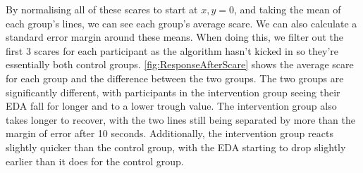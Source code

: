 \documentclass[12pt,a4paper]{article}\usepackage[]{graphicx}\usepackage[]{color}
\begin{document}
By normalising all of these scares to start at $x,y = 0$, and taking the mean of each group's lines, we can see each group's average scare.
We can also calculate a standard error margin around these means.
When doing this, we filter out the first 3 scares for each participant as the algorithm hasn't kicked in so they're essentially both control groups.
\vref{fig:ResponseAfterScare} shows the average scare for each group and the difference between the two groups.
The two groups are significantly different, with participants in the intervention group seeing their EDA fall for longer and to a lower trough value.
The intervention group also takes longer to recover, with the two lines still being separated by more than the margin of error after 10 seconds.
Additionally, the intervention group reacts slightly quicker than the control group, with the EDA starting to drop slightly earlier than it does for the control group.
\end{document}
